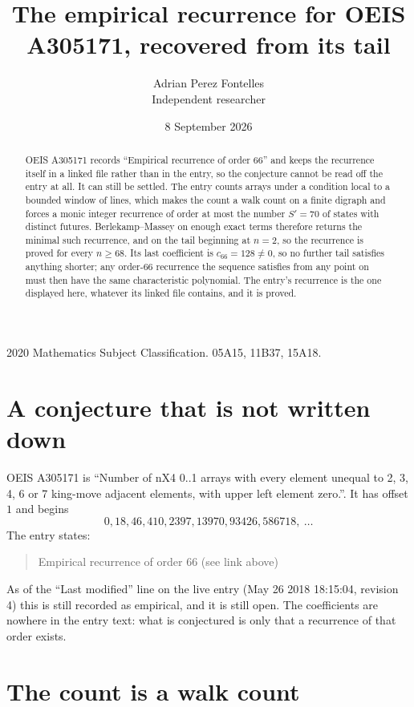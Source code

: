 \documentclass[11pt,a4paper]{article}
\title{The empirical recurrence for OEIS A305171, recovered from its tail}
\author{Adrian Perez Fontelles\\ \small Independent researcher}
\date{8 September 2026}
\theoremstyle{plain}
\theoremstyle{definition}
\begin{document}
\maketitle

\begin{abstract}
OEIS A305171 records ``Empirical recurrence of order $66$'' and keeps the recurrence itself in
a linked file rather than in the entry, so the conjecture cannot be read off the entry at all.
It can still be settled. The entry counts arrays under a condition local to a bounded window of
lines, which makes the count a walk count on a finite digraph and forces a monic integer
recurrence of order at most the number $S'=70$ of states with distinct futures. Berlekamp--Massey on
enough exact terms therefore returns the minimal such recurrence, and on the tail beginning at $n=2$, so the recurrence is proved for every $n\ge68$.
Its last coefficient is $c_{66}=128\neq0$, so no further tail satisfies anything
shorter; any order-$66$ recurrence the sequence satisfies from any point on must then have
the same characteristic polynomial. The entry's recurrence is the one displayed here, whatever
its linked file contains, and it is proved.
\end{abstract}

\noindent\small 2020 Mathematics Subject Classification. 05A15, 11B37, 15A18.\normalsize

\section{A conjecture that is not written down}

OEIS A305171 is ``Number of nX4 0..1 arrays with every element unequal to 2, 3, 4, 6 or 7 king-move adjacent elements, with upper left element zero.''. It has offset $1$ and begins
\[
0, 18, 46, 410, 2397, 13970, 93426, 586718,\ \dots
\]
The entry states:
\begin{quote}
Empirical recurrence of order 66 (see link above)
\end{quote}
As of the ``Last modified'' line on the live entry (May 26 2018 18:15:04, revision 4)
this is still recorded as empirical, and it is still open. The coefficients are nowhere in the
entry text: what is conjectured is only that a recurrence of that order exists.

\section{The count is a walk count}
\end{document}
